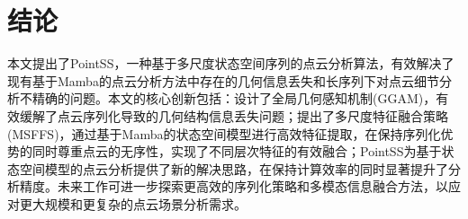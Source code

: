 \documentclass[preprint,12pt]{elsarticle}
\begin{document}
\section{结论}
本文提出了PointSS，一种基于多尺度状态空间序列的点云分析算法，有效解决了现有基于Mamba的点云分析方法中存在的几何信息丢失和长序列下对点云细节分析不精确的问题。本文的核心创新包括：设计了全局几何感知机制(GGAM)，有效缓解了点云序列化导致的几何结构信息丢失问题；提出了多尺度特征融合策略(MSFFS)，通过基于Mamba的状态空间模型进行高效特征提取，在保持序列化优势的同时尊重点云的无序性，实现了不同层次特征的有效融合；PointSS为基于状态空间模型的点云分析提供了新的解决思路，在保持计算效率的同时显著提升了分析精度。未来工作可进一步探索更高效的序列化策略和多模态信息融合方法，以应对更大规模和更复杂的点云场景分析需求。









\end{document}
